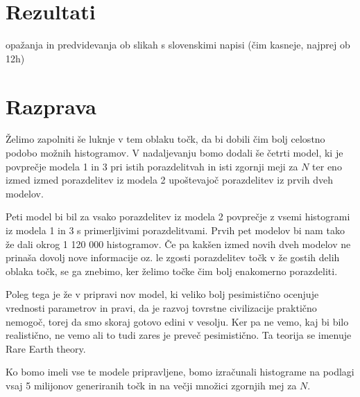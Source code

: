 \documentclass[a4paper]{IEEEtran}
\begin{document}
\section{Rezultati}

opažanja in predvidevanja ob slikah s slovenskimi napisi (čim kasneje, najprej ob 12h)











\section{Razprava}

Želimo zapolniti še luknje v tem oblaku točk, da bi dobili čim bolj celostno podobo možnih histogramov. V nadaljevanju bomo dodali še četrti model, ki je povprečje modela 1 in 3 pri istih porazdelitvah in isti zgornji meji za $N$ ter eno izmed izmed porazdelitev iz modela 2 upoštevajoč porazdelitev iz prvih dveh modelov.

Peti model bi bil za vsako porazdelitev iz modela 2 povprečje z vsemi histogrami iz modela 1 in 3 s primerljivimi porazdelitvami. Prvih pet modelov bi nam tako že dali okrog 1 120 000 histogramov. Če pa kakšen izmed novih dveh modelov ne prinaša dovolj nove informacije oz. le zgosti porazdelitev točk v že gostih delih oblaka točk, se ga znebimo, ker želimo točke čim bolj enakomerno porazdeliti.

Poleg tega je že v pripravi nov model, ki veliko bolj pesimistično ocenjuje vrednosti parametrov in pravi, da je razvoj tovrstne civilizacije praktično nemogoč, torej da smo skoraj gotovo edini v vesolju. Ker pa ne vemo, kaj bi bilo realistično, ne vemo ali to tudi zares je preveč pesimistično. Ta teorija se imenuje Rare Earth theory.

Ko bomo imeli vse te modele pripravljene, bomo izračunali histograme na podlagi vsaj 5 milijonov generiranih točk in na večji množici zgornjih mej za $N$.
\end{document}
